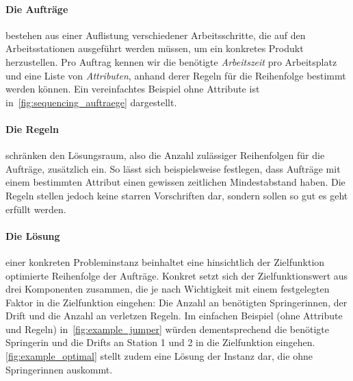 \paragraph{Die Aufträge} bestehen aus einer Auflistung verschiedener Arbeitsschritte, die auf den Arbeitsstationen ausgeführt werden müssen,
um ein konkretes Produkt herzustellen.
Pro Auftrag kennen wir die benötigte \emph{Arbeitszeit} pro Arbeitsplatz und eine Liste von \emph{Attributen},
anhand derer Regeln für die Reihenfolge bestimmt werden können.
Ein vereinfachtes Beispiel ohne Attribute ist in~\cref{fig:sequencing_auftraege} dargestellt.

\paragraph{Die Regeln} schränken den Lösungsraum, also die Anzahl zulässiger Reihenfolgen für die Aufträge,
zusätzlich ein.
So lässt sich beispielsweise festlegen, dass Aufträge mit einem bestimmten Attribut einen gewissen zeitlichen Mindestabstand haben.
Die Regeln stellen jedoch keine starren Vorschriften dar, sondern sollen so gut es geht erfüllt werden.

\paragraph{Die Lösung} einer konkreten Probleminstanz beinhaltet eine hinsichtlich der Zielfunktion optimierte Reihenfolge der Aufträge.
Konkret setzt sich der Zielfunktionswert aus drei Komponenten zusammen, die je nach Wichtigkeit mit einem festgelegten Faktor in die Zielfunktion eingehen:
Die Anzahl an benötigten Springerinnen, der Drift und die Anzahl an verletzen Regeln.
Im einfachen Beispiel (ohne Attribute und Regeln) in~\cref{fig:example_jumper} würden dementsprechend die benötigte Springerin
und die Drifts an Station 1 und 2 in die Zielfunktion eingehen.
\cref{fig:example_optimal} stellt zudem eine Lösung der Instanz dar, die ohne Springerinnen auskommt.

